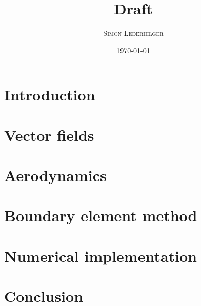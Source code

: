 \documentclass[12pt]{article}
\title{Draft}
\subtitle{\textit{\headcourse}}
\author{\textsc{Simon Lederhilger}}
\date{\today}
\begin{document}
\maketitle\thispagestyle{fancy}
%
\newpage\tableofcontents

\newpage
\printunsrtglossary[type=symbols,style=topicmcols]
%

\newpage


\newpage
\section{Introduction}


\newpage
\section{Vector fields}


\section{Aerodynamics}


\section[Boundary element method]{Boundary element method}


\section{Numerical implementation}


\section{Conclusion}


\printbibliography
\end{document}
